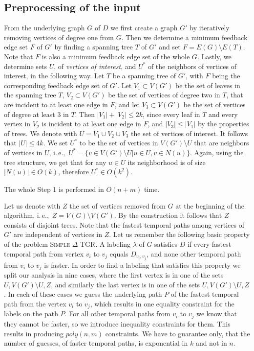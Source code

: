 \documentclass[11pt,a4paper]{article}
\theoremstyle{remark}
\theoremstyle{definition}
\newcommand{\ie}{i.\,e.,\ }
\newcommand{\deltaExact}{\textsc{Simple $\Delta$-TGR}}
\begin{document}
\subsection{Preprocessing of the input}
From the underlying graph $G$ of $D$ we first create a graph $G'$ by
iteratively removing vertices of degree one from $G$.
Then we determine a minimum feedback edge set $F$ of $G'$ by finding a spanning tree $T$ of $G'$ and set $F = E(G) \setminus E(T)$. 
Note that $F$ is also a minimum feedback edge set of the whole $G$.
Lastly, we determine sets $U$, of \emph{vertices of interest}, and $U^*$ of the neighbors of vertices of interest, in the following way.
Let $T$ be a spanning tree of $G'$, with $F$ being the corresponding feedback edge set of $G'$.
Let $V_1 \subset V(G')$ be the set of leaves in the spanning tree $T$, $V_2 \subset V(G')$ be the set of vertices of degree two in $T$, that are incident to at least one edge in $F$, 
and let $V_3 \subset V(G')$ be the set of vertices of degree at least $3$ in $T$. 
Then $|V_1| + |V_2| \leq 2k$, since every leaf in $T$ and every vertex in $V_2$ is incident to at least one edge in $F$,
and $|V_3| \leq |V_1|$ by the properties of trees.
We denote with $U = V_1 \cup V_2 \cup V_3$ the set of vertices of interest. It follows that $|U| \leq 4k$.
We set $U^*$ to be the set of vertices in $V(G') \setminus U$ that are neighbors of vertices in $U$, \ie $U^* = \{v \in V(G') \setminus U | u \in U, v \in N(u)\}$.
Again, using the tree structure, we get that for any $u \in U$ its neighborhood is of size $|N(u)| \in O(k)$, therefore $U^* \in O(k^2)$.

The whole Step 1 is performed in $O(n + m)$ time.


Let us denote with $Z$ the set of vertices removed from $G$ at the beginning of the algorithm, \ie $Z = V(G) \setminus V(G')$.
By the construction it follows that $Z$ consists of disjoint trees. 
Note that the fastest temporal paths among vertices of $G'$ are independent of vertices in $Z$.
Let us remember the following basic property of the problem \deltaExact.
A labeling $\lambda$ of $G$ satisfies $D$ if every fastest temporal path from vertex $v_i$ to $v_j$ equals $D_{v_i, v_j}$,
and none other temporal path from $v_i$ to $v_j$ is faster.
In order to find a labeling that satisfies this property we split our analysis in nine cases,
where the first vertex is in one of the sets $U,V(G') \setminus U, Z$,
and similarly the last vertex is in one of the sets $U,V(G') \setminus U, Z$.
In each of these cases we guess the underlying path $P$ of the fastest temporal path from the vertex $v_i$ to $v_j$, 
which results in one equality constraint for the labels on the path $P$. 
For all other temporal paths from $v_i$ to $v_j$ we know that they cannot be faster, so we introduce inequality constraints for them.
This results in producing $poly(n,m)$ constraints. We have to guarantee only, that the number of guesses, of faster temporal paths, is exponential in $k$ and not in $n$.
\end{document}
